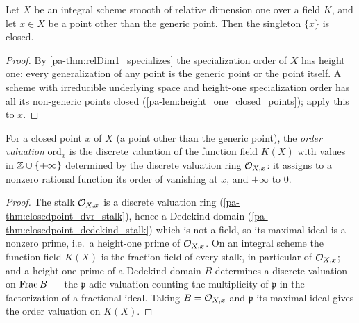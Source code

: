 \begin{theorem}
  \label{pa-thm:closedpoint_isClosed}
  \leanok

  Let \(X\) be an integral scheme smooth of relative dimension one over a field \(K\), and let
  \(x \in X\) be a point other than the generic point. Then the singleton \(\{x\}\) is closed.
\end{theorem}
\begin{proof}
  \leanok
  By \ref{pa-thm:relDim1_specializes} the specialization order of \(X\) has height one: every
  generalization of any point is the generic point or the point itself. A scheme with
  irreducible underlying space and height-one specialization order has all its non-generic
  points closed (\ref{pa-lem:height_one_closed_points}); apply this to \(x\).
\end{proof}

\begin{definition}
  \label{pa-def:scheme_ord}
  \leanok

  For a closed point \(x\) of \(X\) (a point other than the generic point), the
  \emph{order valuation} \(\mathrm{ord}_x\) is the discrete valuation of the function field
  \(K(X)\) with values in \(\mathbb{Z} \cup \{+\infty\}\) determined by the discrete valuation ring
  \(\mathcal{O}_{X,x}\): it assigns to a nonzero rational function its order of vanishing at \(x\),
  and \(+\infty\) to \(0\).
\end{definition}
\begin{proof}
  \leanok
  The stalk \(\mathcal{O}_{X,x}\) is a discrete valuation ring (\ref{pa-thm:closedpoint_dvr_stalk}),
  hence a Dedekind domain (\ref{pa-thm:closedpoint_dedekind_stalk}) which is not a field, so its
  maximal ideal is a nonzero prime, i.e.\ a height-one prime of \(\mathcal{O}_{X,x}\). On an integral
  scheme the function field \(K(X)\) is the fraction field of every stalk, in particular of
  \(\mathcal{O}_{X,x}\); and a height-one prime of a Dedekind domain \(B\) determines a discrete
  valuation on \(\operatorname{Frac} B\) --- the \(\mathfrak p\)-adic valuation counting the multiplicity of
  \(\mathfrak p\) in the factorization of a fractional ideal. Taking \(B = \mathcal{O}_{X,x}\) and
  \(\mathfrak p\) its maximal ideal gives the order valuation on \(K(X)\).
\end{proof}

